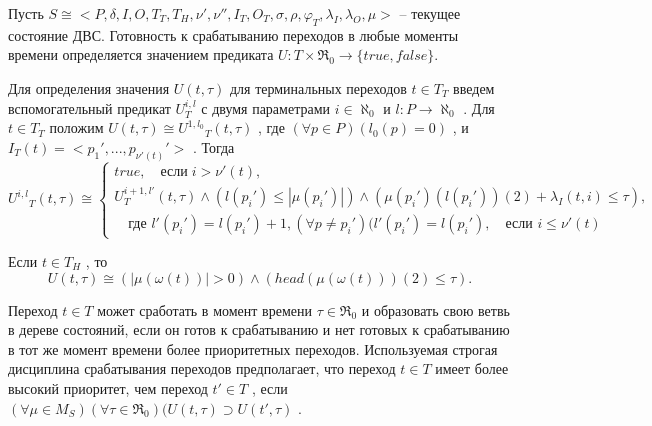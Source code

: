 		Пусть $ S\cong<P,\delta,I,O,T_T,T_H,\nu',\nu'',I_T,O_T,\sigma,\rho,\varphi_T,\lambda_I, \lambda_O,\mu> $
		-- текущее состояние ДВС.  Готовность к срабатыванию переходов в любые моменты времени определяется значением
		предиката $ U:T\times\Re_0\rightarrow\{true,false\} $.
		
		Для определения значения $ U(t,\tau) $    для терминальных переходов $t\in T_T$
		введем вспомогательный предикат  $ {U^{i,l}_T} $     
		с двумя параметрами $ i\in \aleph_0 $   и $ l:P\rightarrow\aleph_0 $  .
		Для  $ t\in T_T $   положим $ U(t,\tau)\cong {U^{1,l_0}}_T(t,\tau) $  ,
		где $ (\forall p\in P)(l_0(p) = 0) $  , и $ I_T(t)=<{p_1}',...,{p_{\nu'(t)}}' > $   .
		Тогда 
		\begin{equation}
			{U^{i,l}}_T(t,\tau)\cong
			\begin{cases}
				true, \quad \text{если}\; i > \nu'(t),\\
				U^{i+1,l'}_T(t,\tau)\wedge(l(p_i')\leq|\mu(p_i')|)\wedge(\mu(p_i')(l(p_i')) (2) +\lambda_I(t,i)\leq \tau),\\
				\quad \text{где } l'(p_i')=l(p_i')+1, (\forall p \not= p_i')(l'(p_i')=l(p_i'), \quad \text{если } i\leq \nu'(t)
			\end{cases}
		\end{equation}
		
		Если   $ t\in T_H $ , то	
		\begin{equation}
			U(t,\tau)\cong(|\mu(\omega(t))|>0)\wedge(head(\mu(\omega(t)))(2)\leq \tau).
		\end{equation}
		
		Переход  $ t\in T $   может сработать в момент времени  $ \tau\in\Re_0 $   и образовать свою ветвь в дереве состояний,
		если он готов к срабатыванию и нет готовых к срабатыванию в тот же момент времени более приоритетных переходов.
		Используемая строгая дисциплина срабатывания переходов предполагает, 
		что переход $ t\in T $ имеет более высокий приоритет, чем переход  $ t'\in T $  ,
		если $ (\forall\mu \in M_S)(\forall \tau \in \Re_0) (U(t,\tau)\supset U(t',\tau) $  .
		
